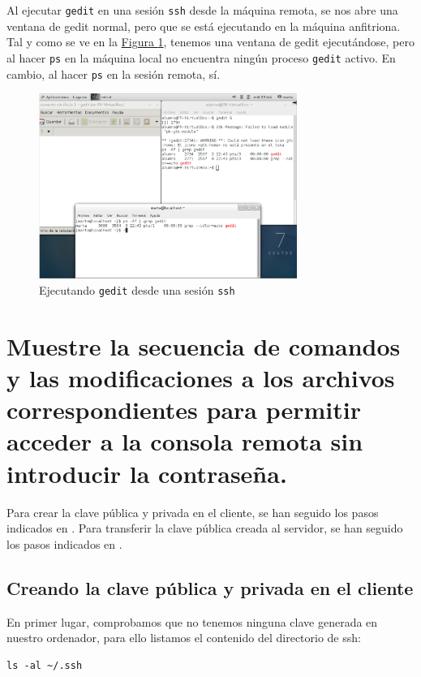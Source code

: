 \documentclass[10pt,a4paper,spanish]{article}
\numberwithin{equation}{section} %
\numberwithin{figure}{section} %
\numberwithin{table}{section} %
\begin{document}
Al ejecutar \texttt{gedit} en una sesión \texttt{ssh} desde la máquina remota, se nos abre una ventana de gedit normal, pero que se está ejecutando en la máquina anfitriona. Tal y como se ve en la \hyperref[sshgedit]{Figura \ref*{sshgedit}}, tenemos una ventana de gedit ejecutándose, pero al hacer \texttt{ps} en la máquina local no encuentra ningún proceso \texttt{gedit} activo. En cambio, al hacer \texttt{ps} en la sesión remota, sí.

\begin{figure}[!h]
\centering
\includegraphics[width=0.75\textwidth]{3}
\caption{Ejecutando \texttt{gedit} desde una sesión \texttt{ssh}}
\label{sshgedit}
\end{figure}

\section{Muestre la secuencia de comandos y las modificaciones a los archivos correspondientes para permitir acceder a la consola remota sin introducir la contraseña.}

Para crear la clave pública y privada en el cliente, se han seguido los pasos indicados en \cite{gitssh}. Para transferir la clave pública creada al servidor, se han seguido los pasos indicados en \cite{ubussh}.

\subsection{Creando la clave pública y privada en el cliente}
En primer lugar, comprobamos que no tenemos ninguna clave generada en nuestro ordenador, para ello listamos el contenido del directorio de ssh:

\begin{verbatim}
ls -al ~/.ssh
\end{verbatim}
\end{document}

